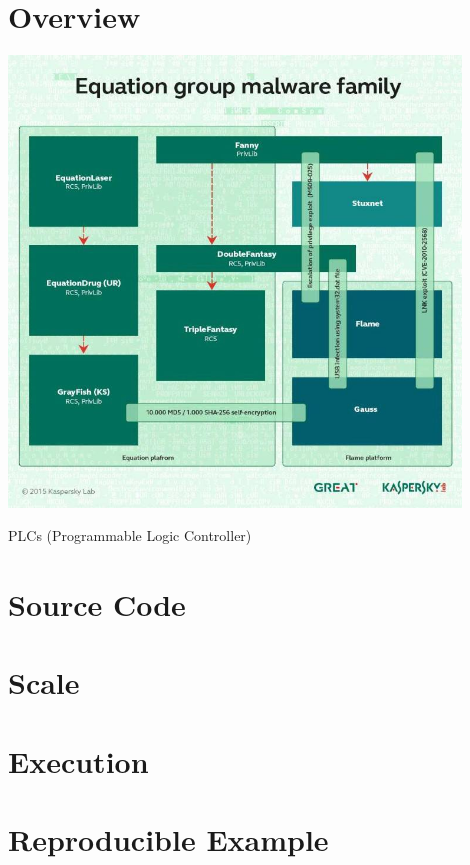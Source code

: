 \documentclass[12pt, letterpaper]{article}
\begin{document}
\begin{sloppypar}


\begin{flushleft}
\section{Overview}
\begin{center}
{\includegraphics[width=0.9\textwidth]{equation_group_family.jpg}}
\end{center}

PLCs (Programmable Logic Controller)


\section{Source Code}



\section*{Scale}


\section*{Execution}


\section*{Reproducible Example}



\end{flushleft}
\end{sloppypar}
\end{document}
